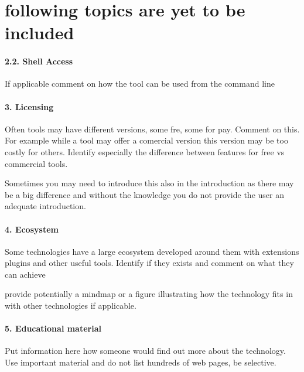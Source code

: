 \documentclass[9pt,twocolumn,twoside]{../../styles/osajnl}
\begin{document}
\section{following topics are yet to be included}
\paragraph{2.2. Shell Access}
If applicable comment on how the tool can be used from the command
line
\paragraph{3. Licensing}
Often tools may have different versions, some fre, some for
pay. Comment on this. For example while a tool may offer a comercial
version this version may be too costly for others. Identify especially
the difference between features for free vs commercial tools.

Sometimes you may need to introduce this also in the introduction as
there may be a big difference and without the knowledge you do not
provide the user an adequate introduction.

\paragraph{4. Ecosystem}

Some technologies have a large ecosystem developed around them with
extensions plugins and other useful tools. Identify if they exists and
comment on what they can achieve

provide potentially a mindmap or a figure illustrating how the
technology fits in with other technologies if applicable.


\paragraph{5. Educational material}

Put information here how someone would find out more about the
technology. Use important material and do not list hundreds of web
pages, be selective.
\end{document}
